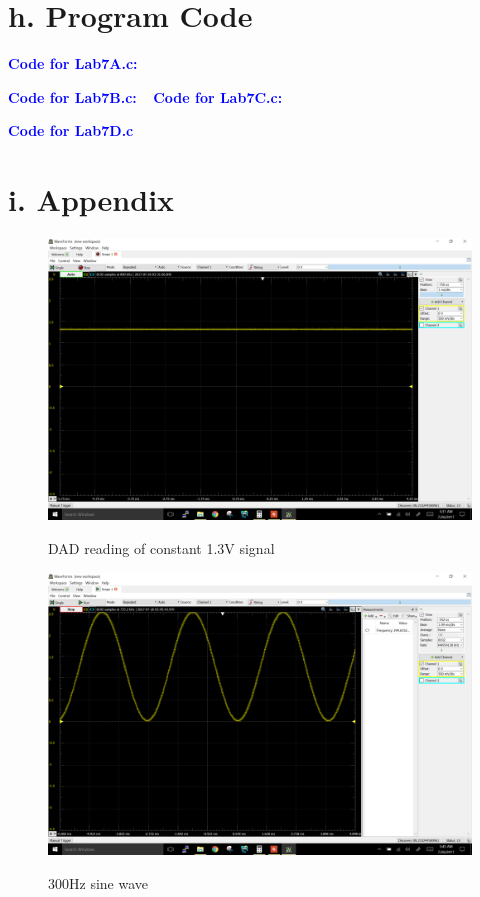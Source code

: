 \documentclass[11pt]{article}
\theoremstyle{plain}
\theoremstyle{definition}
\begin{document}
\section*{h. Program Code}
\textbf{\textcolor{blue}{Code for Lab7A.c:}}

\newpage
\textbf{\textcolor{blue}{Code for Lab7B.c:}}
\
\newpage
\textbf{\textcolor{blue}{Code for Lab7C.c:}}

\newpage
\textbf{\textcolor{blue}{Code for Lab7D.c}}

\newpage
%
%
%
%
\section*{i. Appendix}
\begin{figure}[H]
	\centering
	\includegraphics[width=\textwidth]{A}
	\label{fig:a}
	\caption{DAD reading of constant 1.3V signal}
\end{figure}
\begin{figure}[H]
	\centering
	\includegraphics[width=\textwidth]{B}
	\label{fig:b}
	\caption{300Hz sine wave}
\end{figure}
\end{document}
